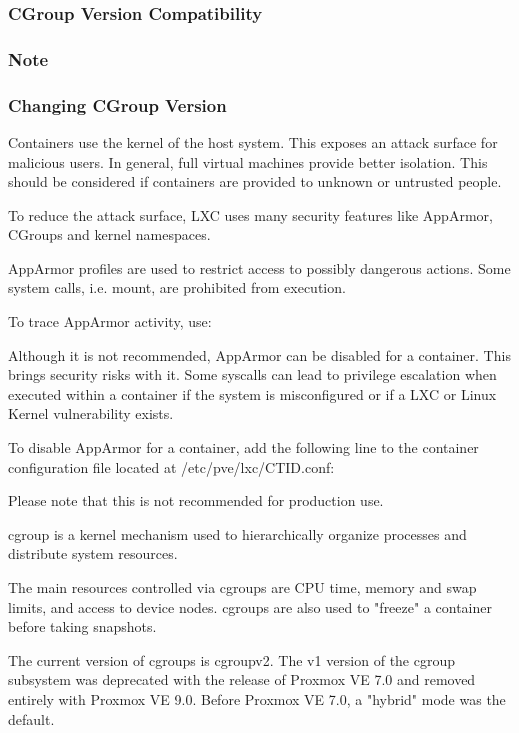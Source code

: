 \subsubsection{CGroup Version Compatibility}

\subsubsection{Note}

\subsubsection{Changing CGroup Version}

Containers use the kernel of the host system. This exposes an attack surface for malicious users. In general, full virtual machines provide better isolation. This should be considered if containers are provided to unknown or untrusted people.

To reduce the attack surface, LXC uses many security features like AppArmor, CGroups and kernel namespaces.

AppArmor profiles are used to restrict access to possibly dangerous actions. Some system calls, i.e. mount, are prohibited from execution.

To trace AppArmor activity, use:

Although it is not recommended, AppArmor can be disabled for a container. This brings security risks with it. Some syscalls can lead to privilege escalation when executed within a container if the system is misconfigured or if a LXC or Linux Kernel vulnerability exists.

To disable AppArmor for a container, add the following line to the container configuration file located at /etc/pve/lxc/CTID.conf:

Please note that this is not recommended for production use.

cgroup is a kernel mechanism used to hierarchically organize processes and distribute system resources.

The main resources controlled via cgroups are CPU time, memory and swap limits, and access to device nodes. cgroups are also used to "freeze" a container before taking snapshots.

The current version of cgroups is cgroupv2. The v1 version of the cgroup subsystem was deprecated with the release of Proxmox VE 7.0 and removed entirely with Proxmox VE 9.0. Before Proxmox VE 7.0, a "hybrid" mode was the default.

